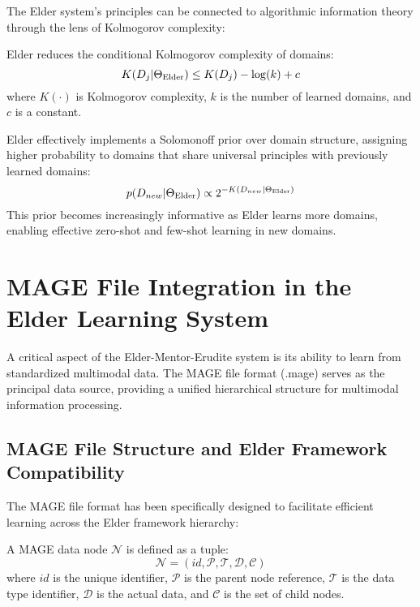 The Elder system's principles can be connected to algorithmic information theory through the lens of Kolmogorov complexity:

\begin{theorem}
Elder reduces the conditional Kolmogorov complexity of domains:
\begin{equation}
K(D_j | \Theta_{\text{Elder}}) \leq K(D_j) - \log(k) + c
\end{equation}
where $K(\cdot)$ is Kolmogorov complexity, $k$ is the number of learned domains, and $c$ is a constant.
\end{theorem}

\begin{proposition}
Elder effectively implements a Solomonoff prior over domain structure, assigning higher probability to domains that share universal principles with previously learned domains:
\begin{equation}
p(D_{new} | \Theta_{\text{Elder}}) \propto 2^{-K(D_{new} | \Theta_{\text{Elder}})}
\end{equation}
This prior becomes increasingly informative as Elder learns more domains, enabling effective zero-shot and few-shot learning in new domains.
\end{proposition}

\section{MAGE File Integration in the Elder Learning System}

A critical aspect of the Elder-Mentor-Erudite system is its ability to learn from standardized multimodal data. The MAGE file format (.mage) serves as the principal data source, providing a unified hierarchical structure for multimodal information processing.

\subsection{MAGE File Structure and Elder Framework Compatibility}

The MAGE file format has been specifically designed to facilitate efficient learning across the Elder framework hierarchy:

\begin{definition}
A MAGE data node $\mathcal{N}$ is defined as a tuple:
\begin{equation}
\mathcal{N} = (id, \mathcal{P}, \mathcal{T}, \mathcal{D}, \mathcal{C})
\end{equation}
where $id$ is the unique identifier, $\mathcal{P}$ is the parent node reference, $\mathcal{T}$ is the data type identifier, $\mathcal{D}$ is the actual data, and $\mathcal{C}$ is the set of child nodes.
\end{definition}

